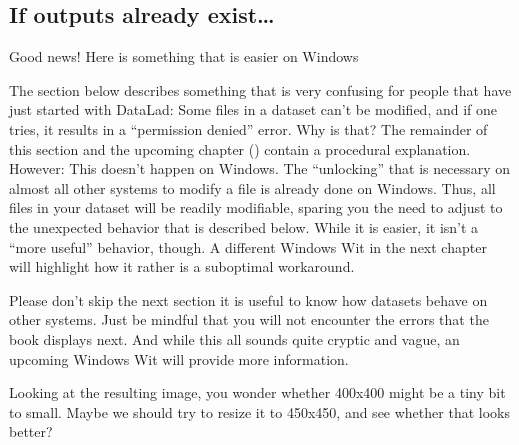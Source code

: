 \subsection{If outputs already exist…}
\label{\detokenize{basics/101-110-run2:if-outputs-already-exist}}
\ignorespaces \begin{windowswit}[label={fom-rerun-unlocked}, before title={\thetcbcounter\ }, float, floatplacement=tb, check odd page=true]{Good news! Here is something that is easier on Windows}
\label{\detokenize{basics/101-110-run2:fom-rerun-unlocked}}

\sphinxAtStartPar
The section below describes something that is very confusing for people that have just started with DataLad: Some files in a dataset can’t be modified, and if one tries, it results in a “permission denied” error.
Why is that?
The remainder of this section and the upcoming chapter {\hyperref[\detokenize{basics/basics-annex:chapter-gitannex}]{}} () contain a procedural explanation.
However: This doesn’t happen on Windows.
The “unlocking” that is necessary on almost all other systems to modify a file is already done on Windows.
Thus, all files in your dataset will be readily modifiable, sparing you the need to adjust to the unexpected behavior that is described below.
While it is easier, it isn’t a “more useful” behavior, though.
A different Windows Wit in the next chapter will highlight how it rather is a suboptimal workaround.

\sphinxAtStartPar
Please don’t skip the next section \textendash{} it is useful to know how datasets behave on other systems.
Just be mindful that you will not encounter the errors that the book displays next.
And while this all sounds quite cryptic and vague, an upcoming Windows Wit will provide more information.


\end{windowswit}

\sphinxAtStartPar
Looking at the resulting image, you wonder whether 400x400 might be a tiny bit to small.
Maybe we should try to resize it to 450x450, and see whether that looks better?

